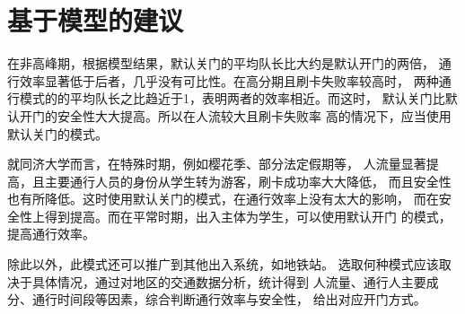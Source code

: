 \section{基于模型的建议}
\par 在非高峰期，根据模型结果，默认关门的平均队长比大约是默认开门的两倍，
通行效率显著低于后者，几乎没有可比性。在高分期且刷卡失败率较高时，
两种通行模式的的平均队长之比趋近于1，表明两者的效率相近。而这时，
默认关门比默认开门的安全性大大提高。所以在人流较大且刷卡失败率
高的情况下，应当使用默认关门的模式。
\par 就同济大学而言，在特殊时期，例如樱花季、部分法定假期等，
人流量显著提高，且主要通行人员的身份从学生转为游客，刷卡成功率大大降低，
而且安全性也有所降低。这时使用默认关门的模式，在通行效率上没有太大的影响，
而在安全性上得到提高。而在平常时期，出入主体为学生，可以使用默认开门
的模式，提高通行效率。
\par 除此以外，此模式还可以推广到其他出入系统，如地铁站。
选取何种模式应该取决于具体情况，通过对地区的交通数据分析，统计得到
人流量、通行人主要成分、通行时间段等因素，综合判断通行效率与安全性，
给出对应开门方式。